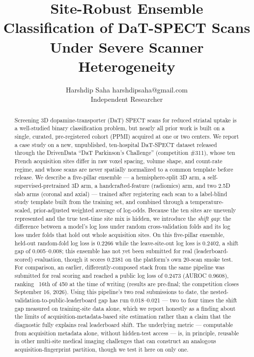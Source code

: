 \documentclass[10pt]{article}
\title{Site-Robust Ensemble Classification of DaT-SPECT Scans Under Severe Scanner Heterogeneity}
\author{\name Harshdip Saha \email harshdipsaha@gmail.com \\
      \addr Independent Researcher}
\begin{document}
\maketitle

\begin{abstract}
Screening 3D dopamine-transporter (DaT) SPECT scans for reduced striatal uptake is a well-studied binary classification problem, but nearly all prior work is built on a single, curated, pre-registered cohort (PPMI) acquired at one or two centers. We report a case study on a new, unpublished, ten-hospital DaT-SPECT dataset released through the DrivenData ``DaT Parkinson's Challenge'' (competition \#311), whose ten French acquisition sites differ in raw voxel spacing, volume shape, and count-rate regime, and whose scans are never spatially normalized to a common template before release. We describe a five-pillar ensemble --- a hemisphere-split 3D arm, a self-supervised-pretrained 3D arm, a handcrafted-feature (radiomics) arm, and two 2.5D slab arms (coronal and axial) --- trained after registering each scan to a label-blind study template built from the training set, and combined through a temperature-scaled, prior-adjusted weighted average of log-odds. Because the ten sites are unevenly represented and the true test-time site mix is hidden, we introduce the \emph{shift gap}: the difference between a model's log loss under random cross-validation folds and its log loss under folds that hold out whole acquisition sites. On this five-pillar ensemble, held-out random-fold log loss is 0.2266 while the leave-site-out log loss is 0.2402, a shift gap of 0.005--0.008; this ensemble has not yet been submitted for real (leaderboard-scored) evaluation, though it scores 0.2381 on the platform's own 20-scan smoke test. For comparison, an earlier, differently-composed stack from the same pipeline was submitted for real scoring and reached a public log loss of 0.2473 (AUROC 0.9608), ranking ~16th of 450 at the time of writing (results are pre-final; the competition closes September 16, 2026). Using this pipeline's two real submissions to date, the nested-validation-to-public-leaderboard gap has run 0.018--0.021 --- two to four times the shift gap measured on training-site data alone, which we report honestly as a finding about the limits of acquisition-metadata-based site estimation rather than a claim that the diagnostic fully explains real leaderboard shift. The underlying metric --- computable from acquisition metadata alone, without hidden-test access --- is, in principle, reusable in other multi-site medical imaging challenges that can construct an analogous acquisition-fingerprint partition, though we test it here on only one.
\end{abstract}
\end{document}
